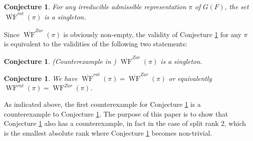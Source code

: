 \documentclass[11pt]{amsart}
\newtheorem{conjecture}[theorem]{Conjecture}
\theoremstyle{remark}
\newcommand{\WF}{\operatorname{WF}}
\newcommand{\bWF}{\overline{\operatorname{WF}}}
\begin{document}
\begin{conjecture}\label{conj:geom} For any irreducible admissible representation $\pi$ of $G(F)$, the set $\bWF^{rat}(\pi)$ is a singleton.
\end{conjecture}

Since $\bWF^{Zar}(\pi)$ is obviously non-empty, the validity of Conjecture \ref{conj:geom} for any $\pi$ is equivalent to the validities of the following two statements:

\begin{conjecture}\label{conj:geom'} (Counterexample in \cite[Thm. 1.1]{Tsa24}) $\bWF^{Zar}(\pi)$ is a singleton.
\end{conjecture}

\begin{conjecture}\label{conj:equivdef} We have $\bWF^{rat}(\pi)=\bWF^{Zar}(\pi)$ or equivalently $\WF^{rat}(\pi)=\WF^{Zar}(\pi)$.
\end{conjecture}

As indicated above, the first counterexample for Conjecture \ref{conj:geom} is a counterexample to Conjecture \ref{conj:geom'}. The purpose of this paper is to show that Conjecture \ref{conj:equivdef} also has a counterexample, in fact in the case of split rank 2, which is the smallest absolute rank where Conjecture \ref{conj:equivdef} becomes non-trivial.
\end{document}
